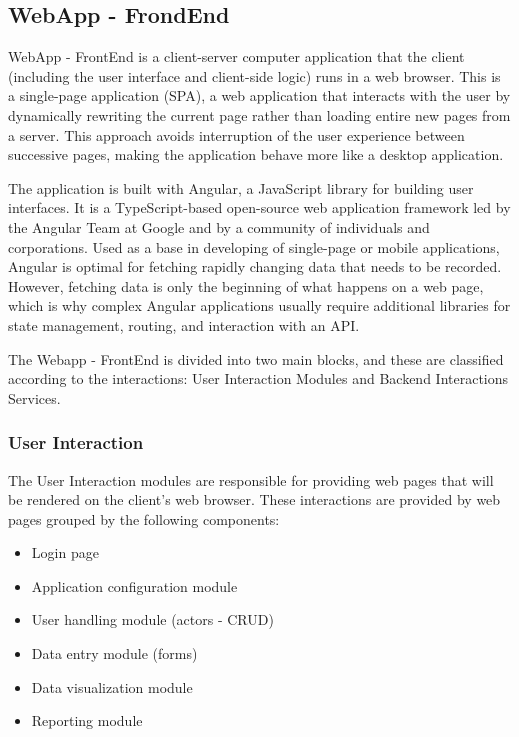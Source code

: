 \subsection{WebApp - FrondEnd}\label{sec:WebAppFrondEnd}
WebApp - FrontEnd is a client-server computer application that the client (including the user interface and client-side logic) runs in a web browser. This is a single-page application (SPA), a web application that interacts with the user by dynamically rewriting the current page rather than loading entire new pages from a server. This approach avoids interruption of the user experience between successive pages, making the application behave more like a desktop application.

The application is built with Angular, a JavaScript library for building user interfaces. It is a TypeScript-based open-source web application framework led by the Angular Team at Google and by a community of individuals and corporations. Used as a base in developing of single-page or mobile applications, Angular is optimal for fetching rapidly changing data that needs to be recorded. However, fetching data is only the beginning of what happens on a web page, which is why complex Angular applications usually require additional libraries for state management, routing, and interaction with an API.

The Webapp - FrontEnd is divided into two main blocks, and these are classified according to the interactions: User Interaction Modules and Backend Interactions Services.

\subsubsection{User Interaction}\label{sec:UserInteraction}
The User Interaction modules are responsible for providing web pages that will be rendered on the client's web browser. These interactions are provided by web pages grouped by the following components:

\begin{itemize}
\item Login page
\item Application configuration module
\item User handling module (actors - CRUD)
\item Data entry module (forms)
\item Data visualization module
\item Reporting module
\end{itemize}

